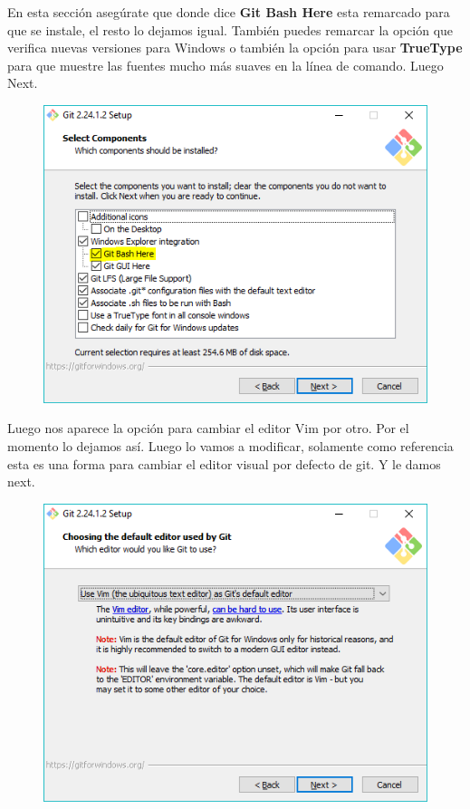 \documentclass{article}
\begin{document}
En esta sección asegúrate que donde dice \textbf{Git Bash Here} esta remarcado
para que se instale, el resto lo dejamos igual. También puedes remarcar la
opción que verifica nuevas versiones para Windows o también la opción para usar
\textbf{TrueType} para que muestre las fuentes mucho más suaves en la línea de
comando. Luego Next.

\begin{figure}[h!]
  \centering
  \includegraphics[scale=0.65]{./Pictures/015_install_git.png}
\end{figure}

Luego nos aparece la opción para cambiar el editor Vim por otro. Por el momento
lo dejamos así. Luego lo vamos a modificar, solamente como referencia esta es
una forma para cambiar el editor visual por defecto de git. Y le damos next.

\begin{figure}[h!]
  \centering
  \includegraphics[scale=0.65]{./Pictures/016_install_git.png}
\end{figure}
\end{document}
